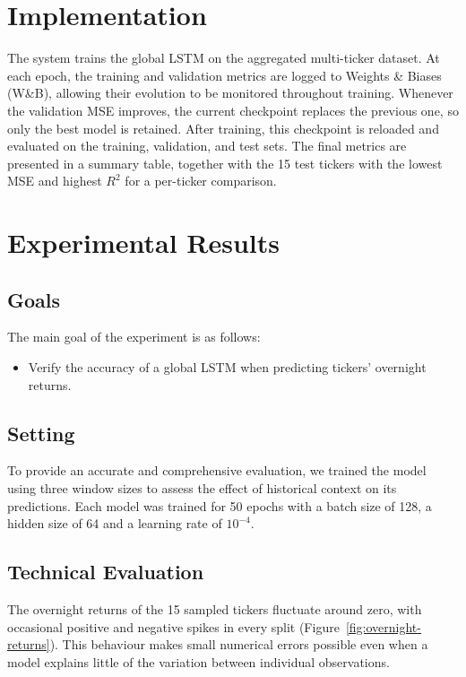 \documentclass[12pt,a4paper]{article}
\begin{document}
\section{Implementation}
The system trains the global LSTM on the aggregated multi-ticker dataset. At
each epoch, the training and validation metrics are logged to Weights \& Biases
(W\&B), allowing their evolution to be monitored throughout training. Whenever
the validation MSE improves, the current checkpoint replaces the previous one,
so only the best model is retained. After training, this checkpoint is reloaded
and evaluated on the training, validation, and test sets. The final metrics are
presented in a summary table, together with the 15 test tickers
with the lowest MSE and highest $R^2$ for a per-ticker comparison.

\section{Experimental Results}

\subsection{Goals}
The main goal of the experiment is as follows:
\begin{itemize}
\item Verify the accuracy of a global LSTM when predicting tickers' overnight
returns.
\end{itemize}

\subsection{Setting}
To provide an accurate and comprehensive evaluation, we trained the model using
three window sizes to assess the effect of historical context on its
predictions. Each model was trained for 50 epochs with a batch size of 128, a
hidden size of 64 and a learning rate of $10^{-4}$. 

\subsection{Technical Evaluation}
The overnight returns of the 15 sampled tickers fluctuate around zero, with
occasional positive and negative spikes in every split
(Figure~\ref{fig:overnight-returns}). This behaviour makes small numerical
errors possible even when a model explains little of the variation between
individual observations.
\end{document}
